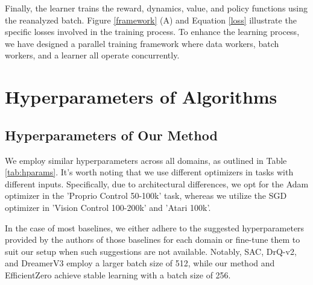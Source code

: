 Finally, the learner trains the reward, dynamics, value, and policy functions using the reanalyzed batch. Figure \ref{framework} (A) and Equation \eqref{loss} illustrate the specific losses involved in the training process. To enhance the learning process, we have designed a parallel training framework where data workers, batch workers, and a learner all operate concurrently.


\section{Hyperparameters of Algorithms}
\label{hyper-param}

\subsection{Hyperparameters of Our Method}

We employ similar hyperparameters across all domains, as outlined in Table \ref{tab:hparams}. It's worth noting that we use different optimizers in tasks with different inputs. Specifically, due to architectural differences, we opt for the Adam optimizer in the 'Proprio Control 50-100k' task, whereas we utilize the SGD optimizer in 'Vision Control 100-200k' and 'Atari 100k'.

In the case of most baselines, we either adhere to the suggested hyperparameters provided by the authors of those baselines for each domain or fine-tune them to suit our setup when such suggestions are not available. Notably, SAC, DrQ-v2, and DreamerV3 employ a larger batch size of 512, while our method and EfficientZero achieve stable learning with a batch size of 256.


